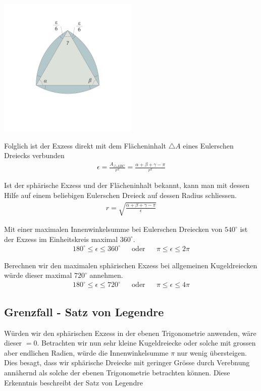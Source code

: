 \begin{refsection}
\begin{center}
        \includegraphics[width=0.5\textwidth]{kugel/SphaerischerExzess.jpg}
\end{center}

Folglich ist der Exzess direkt mit dem Flächeninhalt $\triangle A$ eines Eulerschen Dreiecks verbunden
\begin{align*}
\epsilon =\frac{A_{\triangle{ ABC }}}{r^2} = \frac{\alpha + \beta + \gamma - \pi}{r^2}
\end{align*}

Ist der sphärische Exzess und der Flächeninhalt bekannt, kann man mit dessen Hilfe auf einem beliebigen Eulerschen Dreieck auf dessen Radius schliessen.
\begin{align*}
r = \sqrt{\frac{\alpha + \beta + \gamma - \pi}{\epsilon}}
\end{align*}

Mit einer maximalen Innenwinkelsumme bei Eulerschen Dreiecken von $540^{\circ}$ ist der Exzess im Einheitskreis maximal $360^{\circ}$.
\[
\begin{aligned}
180^{\circ} \le \epsilon \le 360^{\circ}
&
&\text{oder}
&
&\pi \le \epsilon \le 2\pi
\end{aligned}
\]

Berechnen wir den maximalen sphärischen Exzess bei allgemeinen Kugeldreiecken würde dieser maximal $720^{\circ}$ annehmen.
\[
\begin{aligned}
180^{\circ} \le \epsilon \le 720^{\circ}
&
&\text{oder}
&
&\pi \le \epsilon \le 4\pi
\end{aligned}
\]



\subsection{Grenzfall - Satz von Legendre}
Würden wir den sphärischen Exzess in der ebenen Trigonometrie anwenden, wäre dieser $=0$. Betrachten wir nun sehr kleine Kugeldreiecke oder solche mit grossen aber endlichen Radien, würde die Innenwinkelsumme $\pi$ nur wenig übersteigen. Dies besagt, dass wir sphärische Dreiecke mit geringer Grösse durch Verebnung annähernd als solche der ebenen Trigonometrie betrachten können. Diese Erkenntnis beschreibt der Satz von Legendre


\end{refsection}

